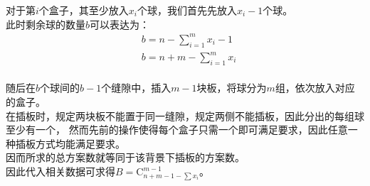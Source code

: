 \documentclass[UTF8]{ctexart}
\newcommand{\Co}{\mathrm{C}}
\begin{document}
    对于第$i$个盒子，其至少放入$x_i$个球，我们首先先放入$x_i-1$个球。\\[3mm]
    此时剩余球的数量$b$可以表达为：
    \begin{align}
        &b=n-\sum_{i=1}^{m}x_i-1\\[3mm]
        &b=n+m-\sum_{i=1}^{m}x_i
    \end{align}\\
    随后在$b$个球间的$b-1$个缝隙中，插入$m-1$块板，将球分为$m$组，依次放入对应的盒子。\\[3mm]
    在插板时，规定两块板不能置于同一缝隙，规定两侧不能插板，因此分出的每组球至少有一个，
    然而先前的操作使得每个盒子只需一个即可满足要求，因此任意一种插板方式均能满足要求。\\[3mm]
    因而所求的总方案数就等同于该背景下插板的方案数。\\[3mm]
    因此代入相关数据可求得$B=\Co_{n+m-1-\sum x_i}^{m-1}$。

\newpage
\end{document}
